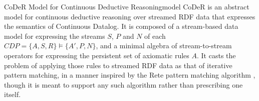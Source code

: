 \begin{nestedsection}{CoDeR Model for Continuous Deductive Reasoning}{model}
	CoDeR is an abstract model for continuous deductive reasoning over streamed RDF data that expresses the semantics of Continuous Datalog.
	It is composed of a stream-based data model for expressing the streams $S$, $P$ and $N$ of each ${CDP = \{A,S,R\} \vDash \{A',P,N\}}$, and a minimal algebra of stream-to-stream operators for expressing the persistent set of axiomatic rules $A$.
	It casts the problem of applying those rules to streamed RDF data as that of iterative pattern matching, in a manner inspired by the Rete pattern matching algorithm \citep{forgy79}, though it is meant to support any such algorithm rather than prescribing one itself.

	



\end{nestedsection}